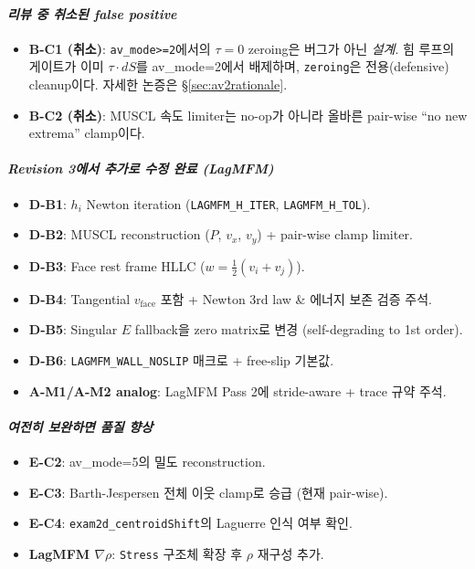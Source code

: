 \documentclass[11pt]{article}
\begin{document}
\paragraph{\textit{리뷰 중 취소된 false positive}}
\begin{itemize}
  \item \textbf{B-C1 (취소)}: \texttt{av\_mode>=2}에서의 $\tau=0$ zeroing은 버그가
        아닌 \emph{설계}. 힘 루프의 게이트가 이미 $\tau\cdot dS$를 av\_mode=2에서
        배제하며, \texttt{zeroing}은 전용(defensive) cleanup이다. 자세한 논증은
        §\ref{sec:av2rationale}.
  \item \textbf{B-C2 (취소)}: MUSCL 속도 limiter는 no-op가 아니라
        올바른 pair-wise ``no new extrema'' clamp이다.
\end{itemize}

\paragraph{\textit{Revision 3에서 추가로 수정 완료 (LagMFM)}}
\begin{itemize}
  \item \textbf{D-B1}: $h_i$ Newton iteration (\texttt{LAGMFM\_H\_ITER}, \texttt{LAGMFM\_H\_TOL}).
  \item \textbf{D-B2}: MUSCL reconstruction ($P$, $v_x$, $v_y$) + pair-wise clamp limiter.
  \item \textbf{D-B3}: Face rest frame HLLC ($w = \tfrac12(v_i+v_j)$).
  \item \textbf{D-B4}: Tangential $v_\mathrm{face}$ 포함 + Newton 3rd law \& 에너지 보존 검증 주석.
  \item \textbf{D-B5}: Singular $E$ fallback을 zero matrix로 변경 (self-degrading to 1st order).
  \item \textbf{D-B6}: \texttt{LAGMFM\_WALL\_NOSLIP} 매크로 + free-slip 기본값.
  \item \textbf{A-M1/A-M2 analog}: LagMFM Pass 2에 stride-aware + trace 규약 주석.
\end{itemize}

\paragraph{\textit{여전히 보완하면 품질 향상}}
\begin{itemize}
  \item \textbf{E-C2}: av\_mode=5의 밀도 reconstruction.
  \item \textbf{E-C3}: Barth-Jespersen 전체 이웃 clamp로 승급 (현재 pair-wise).
  \item \textbf{E-C4}: \texttt{exam2d\_centroidShift}의 Laguerre 인식 여부 확인.
  \item \textbf{LagMFM $\nabla\rho$}: \texttt{Stress} 구조체 확장 후 $\rho$ 재구성 추가.
\end{itemize}
\end{document}
